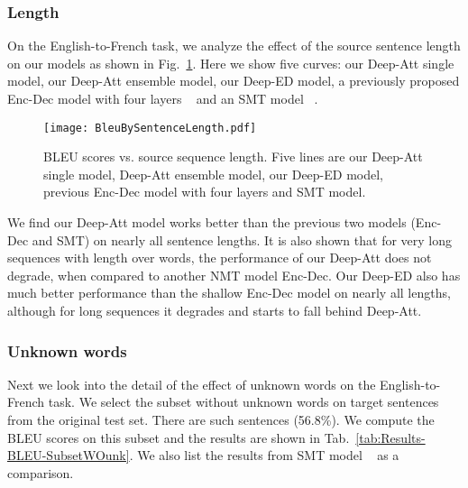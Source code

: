 \documentclass[11pt,letterpaper]{article}
\begin{document}
\subsubsection{Length}
On the English-to-French task, we analyze the effect of the source sentence length on our models as shown in
Fig.~\ref{fig:NMT-Analysis-Length}. Here we show five curves: our Deep-Att single model, our Deep-Att ensemble model, our Deep-ED model, a
previously proposed Enc-Dec model with four layers ~\cite{Sutskever-Le-NIPS2014} and an SMT model ~\cite{Durrani-Heafield-WMT2014}.
\begin{figure}[!ht]
\begin{center}
\texttt{[image: BleuBySentenceLength.pdf]}
\caption{BLEU scores vs. source sequence length. Five lines are our Deep-Att single model, Deep-Att ensemble model, our Deep-ED model,
previous Enc-Dec model with four layers and SMT model.}
\label{fig:NMT-Analysis-Length}
\end{center}
\end{figure}
We find our Deep-Att model works better than the previous two \mbox{models} (Enc-Dec and SMT) on nearly all sentence lengths. It is also shown
that for very long sequences with length over  words, the performance of our Deep-Att does not degrade, when compared to another NMT model
Enc-Dec. Our Deep-ED also has much better performance than the shallow Enc-Dec model on nearly all lengths, although for long sequences it
degrades and starts to fall behind Deep-Att.



\subsubsection{Unknown words}
Next we look into the detail of the effect of unknown words on the English-to-French task. We select the subset without unknown words on
target sentences from the original test set. There are  such sentences (56.8\%). We compute the BLEU scores on this subset and the
results are shown in Tab.~\ref{tab:Results-BLEU-SubsetWOunk}. We also list the results from SMT model ~\cite{Durrani-Heafield-WMT2014} as a
comparison.
\end{document}
